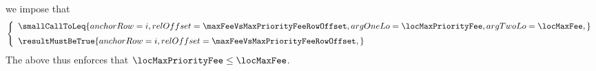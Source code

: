 \item[\underline{\underline{Row n$°(i + \maxFeeVsMaxPriorityFeeRowOffset)$: comparing \locMaxFee{} and \locMaxPriorityFee{}:}}]
	we impose that
	\[
		\left\{ \begin{array}{l}
			\smallCallToLeq {
				anchorRow = i                                ,
				relOffset = \maxFeeVsMaxPriorityFeeRowOffset ,
				argOneLo  = \locMaxPriorityFee               ,
				argTwoLo  = \locMaxFee                       ,
			}
			\vspace{2mm}
			\\
			\resultMustBeTrue {
				anchorRow = i                                ,
				relOffset = \maxFeeVsMaxPriorityFeeRowOffset ,
			}
			\\
		\end{array} \right.
	\]
	\saNote{}
	The above thus enforces that
	$\locMaxPriorityFee \leq \locMaxFee$.
